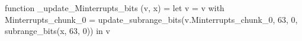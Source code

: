 function _update_Minterrupts_bits (v, x) = let v = { v with Minterrupts_chunk_0 = update_subrange_bits(v.Minterrupts_chunk_0, 63, 0, subrange_bits(x, 63, 0)) } in
  v
